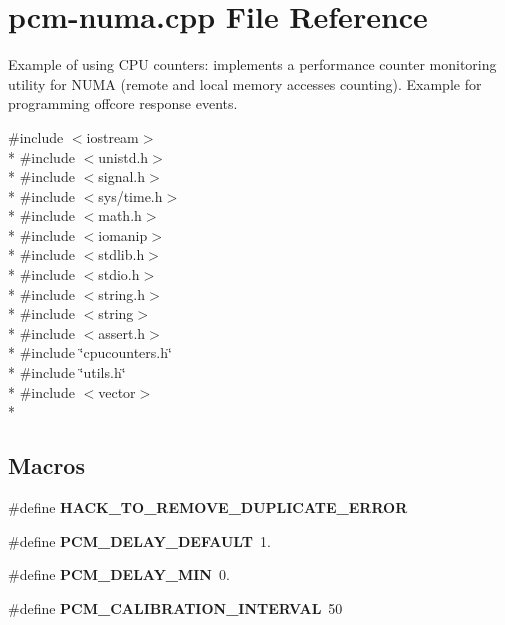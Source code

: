 \section{pcm-\/numa.cpp File Reference}
\label{pcm-numa_8cpp}


Example of using C\+P\+U counters\+: implements a performance counter monitoring utility for N\+U\+M\+A (remote and local memory accesses counting). Example for programming offcore response events.  


{\ttfamily \#include $<$iostream$>$}\\*
{\ttfamily \#include $<$unistd.\+h$>$}\\*
{\ttfamily \#include $<$signal.\+h$>$}\\*
{\ttfamily \#include $<$sys/time.\+h$>$}\\*
{\ttfamily \#include $<$math.\+h$>$}\\*
{\ttfamily \#include $<$iomanip$>$}\\*
{\ttfamily \#include $<$stdlib.\+h$>$}\\*
{\ttfamily \#include $<$stdio.\+h$>$}\\*
{\ttfamily \#include $<$string.\+h$>$}\\*
{\ttfamily \#include $<$string$>$}\\*
{\ttfamily \#include $<$assert.\+h$>$}\\*
{\ttfamily \#include \char`\"{}cpucounters.\+h\char`\"{}}\\*
{\ttfamily \#include \char`\"{}utils.\+h\char`\"{}}\\*
{\ttfamily \#include $<$vector$>$}\\*
\subsection*{Macros}
\begin{DoxyCompactItemize}
\item 
\#define {\bfseries H\+A\+C\+K\+\_\+\+T\+O\+\_\+\+R\+E\+M\+O\+V\+E\+\_\+\+D\+U\+P\+L\+I\+C\+A\+T\+E\+\_\+\+E\+R\+R\+O\+R}\label{pcm-numa_8cpp_ac4eeb11d89b0f517835a12a04443ebe4}

\item 
\#define {\bfseries P\+C\+M\+\_\+\+D\+E\+L\+A\+Y\+\_\+\+D\+E\+F\+A\+U\+L\+T}~1.\label{pcm-numa_8cpp_aa9ecc55c90c7a69729babc4f5f91ed96}

\item 
\#define {\bfseries P\+C\+M\+\_\+\+D\+E\+L\+A\+Y\+\_\+\+M\+I\+N}~0.\label{pcm-numa_8cpp_acccbe8441d6dd75bdc949f5f0ee126c5}

\item 
\#define {\bfseries P\+C\+M\+\_\+\+C\+A\+L\+I\+B\+R\+A\+T\+I\+O\+N\+\_\+\+I\+N\+T\+E\+R\+V\+A\+L}~50\label{pcm-numa_8cpp_a433dde946b6713059756318598c9a6fe}

\end{DoxyCompactItemize}
